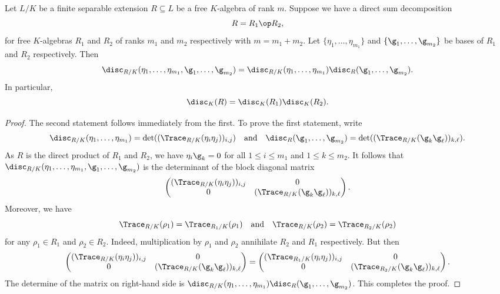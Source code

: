     \begin{proposition}\label{prop:discriminant_and_direct_sums}
      Let $L/K$ be a finite separable extension $R \subseteq L$ be a free $K$-algebra of rank $m$. Suppose we have a direct sum decomposition
      \[
        R = R_{1} \op R_{2},
      \]
      for free $K$-algebras $R_{1}$ and $R_{2}$ of ranks $m_{1}$ and $m_{2}$ respectively with $m = m_{1}+m_{2}$. Let $\{\eta_{1},\ldots,\eta_{m_{1}}\}$ and $\{\g_{1},\ldots,\g_{m_{2}}\}$ be bases of $R_{1}$ and $R_{2}$ respectively. Then
      \[
        \disc_{R/K}(\eta_{1},\ldots,\eta_{m_{1}},\g_{1},\ldots,\g_{m_{2}}) = \disc_{R/K}(\eta_{1},\ldots,\eta_{m_{1}})\disc_{R}(\g_{1},\ldots,\g_{m_{2}}).
      \]
      In particular,
      \[
        \disc_{K}(R) = \disc_{K}(R_{1})\disc_{K}(R_{2}).
      \]
    \end{proposition}
    \begin{proof}
      The second statement follows immediately from the first. To prove the first statement, write
      \[
        \disc_{R/K}(\eta_{1},\ldots,\eta_{m_{1}}) = \det((\Trace_{R/K}(\eta_{i}\eta_{j}))_{i,j}) \quad \text{and} \quad \disc_{R}(\g_{1},\ldots,\g_{m_{2}}) = \det((\Trace_{R/K}(\g_{k}\g_{\ell}))_{k,\ell}).
      \]
      As $R$ is the direct product of $R_{1}$ and $R_{2}$, we have $\eta_{i}\g_{k} = 0$ for all $1 \le i \le m_{1}$ and $1 \le k \le m_{2}$. It follows that $\disc_{R/K}(\eta_{1},\ldots,\eta_{m_{1}},\g_{1},\ldots,\g_{m_{2}})$ is the determinant of the block diagonal matrix
      \[
        \begin{pmatrix} (\Trace_{R/K}(\eta_{i}\eta_{j}))_{i,j} & 0 \\ 0 & (\Trace_{R/K}(\g_{k}\g_{\ell}))_{k,\ell} \end{pmatrix}.
      \]
      Moreover, we have
      \[
        \Trace_{R/K}(\rho_{1}) = \Trace_{R_{1}/K}(\rho_{1}) \quad \text{and} \quad \Trace_{R/K}(\rho_{2}) = \Trace_{R_{2}/K}(\rho_{2})
      \]
      for any $\rho_{1} \in R_{1}$ and $\rho_{2} \in R_{2}$. Indeed, multiplication by $\rho_{1}$ and $\rho_{2}$ annihilate $R_{2}$ and $R_{1}$ respectively. But then
      \[
        \begin{pmatrix} (\Trace_{R/K}(\eta_{i}\eta_{j}))_{i,j} & 0 \\ 0 & (\Trace_{R/K}(\g_{k}\g_{\ell}))_{k,\ell} \end{pmatrix} = \begin{pmatrix} (\Trace_{R_{1}/K}(\eta_{i}\eta_{j}))_{i,j} & 0 \\ 0 & (\Trace_{R_{2}/K}(\g_{k}\g_{\ell}))_{k,\ell} \end{pmatrix}.
      \]
      The determine of the matrix on right-hand side is $\disc_{R/K}(\eta_{1},\ldots,\eta_{m_{1}})\disc_{R}(\g_{1},\ldots,\g_{m_{2}})$. This completes the proof.
    \end{proof}
    
